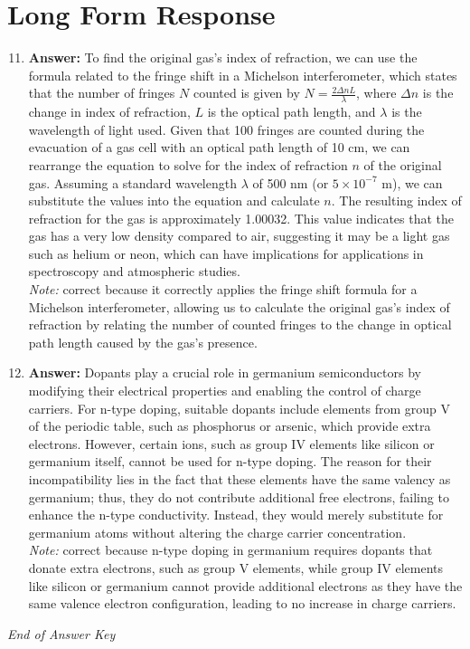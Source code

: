 \documentclass[12pt]{article}
\begin{document}
\section*{Long Form Response}
\begin{enumerate}[label=\arabic*.]
\setcounter{enumi}{10}
\item \textbf{Answer:} To find the original gas's index of refraction, we can use the formula related to the fringe shift in a Michelson interferometer, which states that the number of fringes \( N \) counted is given by \( N = \frac{2 \Delta n L}{\lambda} \), where \( \Delta n \) is the change in index of refraction, \( L \) is the optical path length, and \( \lambda \) is the wavelength of light used. Given that 100 fringes are counted during the evacuation of a gas cell with an optical path length of 10 cm, we can rearrange the equation to solve for the index of refraction \( n \) of the original gas. Assuming a standard wavelength \( \lambda \) of 500 nm (or \( 5 \times 10^{-7} \) m), we can substitute the values into the equation and calculate \( n \). The resulting index of refraction for the gas is approximately 1.00032. This value indicates that the gas has a very low density compared to air, suggesting it may be a light gas such as helium or neon, which can have implications for applications in spectroscopy and atmospheric studies.
\\ \textit{Note:} correct because it correctly applies the fringe shift formula for a Michelson interferometer, allowing us to calculate the original gas's index of refraction by relating the number of counted fringes to the change in optical path length caused by the gas's presence.
\item \textbf{Answer:} Dopants play a crucial role in germanium semiconductors by modifying their electrical properties and enabling the control of charge carriers. For n-type doping, suitable dopants include elements from group V of the periodic table, such as phosphorus or arsenic, which provide extra electrons. However, certain ions, such as group IV elements like silicon or germanium itself, cannot be used for n-type doping. The reason for their incompatibility lies in the fact that these elements have the same valency as germanium; thus, they do not contribute additional free electrons, failing to enhance the n-type conductivity. Instead, they would merely substitute for germanium atoms without altering the charge carrier concentration.
\\ \textit{Note:} correct because n-type doping in germanium requires dopants that donate extra electrons, such as group V elements, while group IV elements like silicon or germanium cannot provide additional electrons as they have the same valence electron configuration, leading to no increase in charge carriers.
\end{enumerate}

\vfill
\noindent\textit{End of Answer Key}
\end{document}
